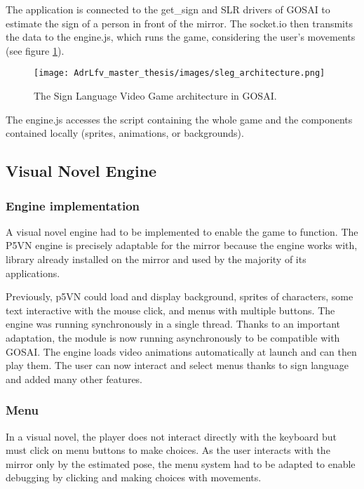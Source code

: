 The application is connected to the get\_sign and SLR drivers of GOSAI to estimate the sign of a person in front of the mirror. The socket.io then transmits the data to the engine.js, which runs the game, considering the user's movements (see figure \ref{fig:sleg_architecture}).

\begin{figure}[h]
    \centering
    \texttt{[image: AdrLfv\_master\_thesis/images/sleg\_architecture.png]}
    \caption{The Sign Language Video Game architecture in GOSAI.}
    \label{fig:sleg_architecture}
\end{figure}

The engine.js accesses the script containing the whole game and the components contained locally (sprites, animations, or backgrounds).

\subsection{Visual Novel Engine}

\subsubsection{Engine implementation}

A visual novel engine had to be implemented to enable the game to function. The P5VN engine is precisely adaptable for the mirror because the engine works with, library already installed on the mirror and used by the majority of its applications.

Previously, p5VN could load and display background, sprites of characters, some text interactive with the mouse click, and menus with multiple buttons.
The engine was running synchronously in a single thread.
Thanks to an important adaptation, the module is now running asynchronously to be compatible with GOSAI. 
The engine loads video animations automatically at launch and can then play them. The user can now interact and select menus thanks to sign language and added many other features.

\subsubsection{Menu}

In a visual novel, the player does not interact directly with the keyboard but must click on menu buttons to make choices. As the user interacts with the mirror only by the estimated pose, the menu system had to be adapted to enable debugging by clicking and making choices with movements.

